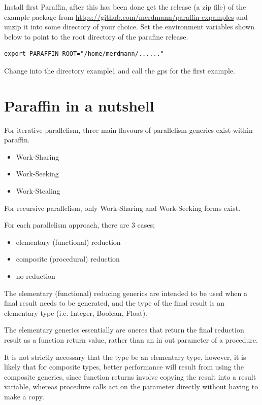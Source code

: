 \documentclass[justified]{tufte-book}
\numberwithin{equation}{subsection}
\begin{document}
Install first Paraffin, after this has been done get the release (a zip file) of the
example package from \url{https://github.com/merdmann/paraffin-expamples} and 
unzip it into some directory of your choice. Set the environment variables shown below to point to the root directory of the parafine release.

\begin{verbatim}
export PARAFFIN_ROOT="/home/merdmann/......"
\end{verbatim}

Change into the directory example1 and call the gps for the first example.

\chapter{Paraffin in a nutshell}
For iterative parallelism, three main flavours of parallelism generics
exist within paraffin.

\begin{itemize}
   \item Work-Sharing
   \item Work-Seeking
   \item Work-Stealing
\end{itemize}
   
For recursive parallelism, only Work-Sharing and Work-Seeking forms
exist.

For each parallelism approach, there are 3 cases;

\begin{itemize}
   \item elementary (functional) reduction
   \item composite  (procedural) reduction
   \item no reduction
\end{itemize}

The elementary (functional) reducing generics are intended to be used
when a final result needs to be generated, and the type of the final
result is an elementary type (i.e. Integer, Boolean, Float).

The elementary generics essentially are oneres that return the final
reduction result as a function return value, rather than an in out
parameter of a procedure.

It is not strictly necessary that the type be an elementary type,
however, it is likely that for composite types, better performance will
result from using the composite generics, since function returns involve
copying the result into a result variable, whereas procedure calls act
on the parameter directly without having to make a copy.
\end{document}
